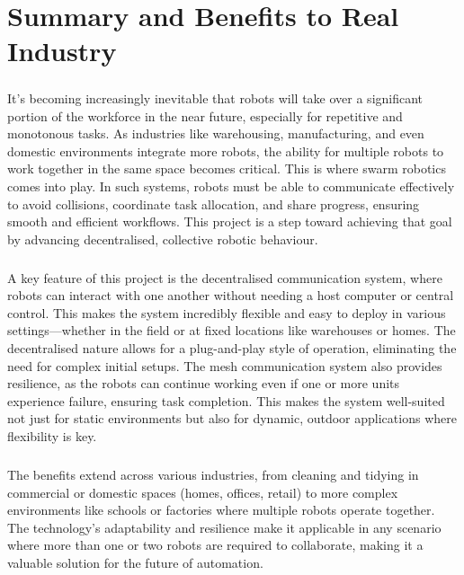 \chapter{Summary and Benefits to Real Industry}

\paragraph*{}
It’s becoming increasingly inevitable that robots will take over a significant portion of the workforce in the near future, especially for repetitive and monotonous tasks. As industries like warehousing, manufacturing, and even domestic environments integrate more robots, the ability for multiple robots to work together in the same space becomes critical. This is where swarm robotics comes into play. In such systems, robots must be able to communicate effectively to avoid collisions, coordinate task allocation, and share progress, ensuring smooth and efficient workflows. This project is a step toward achieving that goal by advancing decentralised, collective robotic behaviour.

\paragraph*{}
A key feature of this project is the decentralised communication system, where robots can interact with one another without needing a host computer or central control. This makes the system incredibly flexible and easy to deploy in various settings—whether in the field or at fixed locations like warehouses or homes. The decentralised nature allows for a plug-and-play style of operation, eliminating the need for complex initial setups. The mesh communication system also provides resilience, as the robots can continue working even if one or more units experience failure, ensuring task completion. This makes the system well-suited not just for static environments but also for dynamic, outdoor applications where flexibility is key.

\paragraph*{}
The benefits extend across various industries, from cleaning and tidying in commercial or domestic spaces (homes, offices, retail) to more complex environments like schools or factories where multiple robots operate together. The technology’s adaptability and resilience make it applicable in any scenario where more than one or two robots are required to collaborate, making it a valuable solution for the future of automation.
